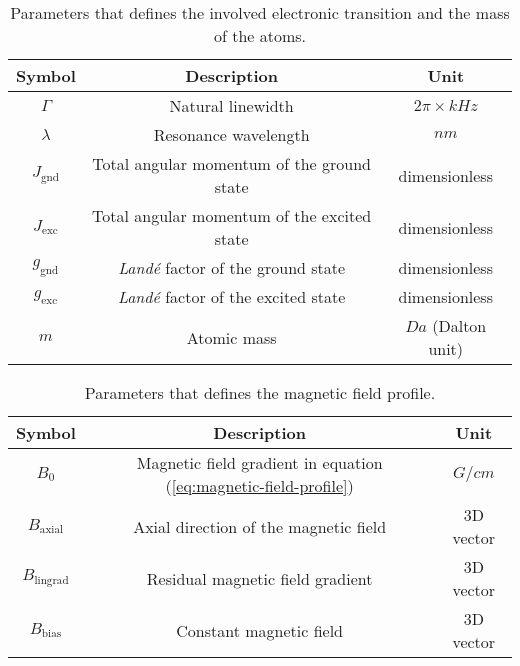 \begin{table}[ht!]
    \centering
    \begin{tabular}{|c|c|c|}
        \hline
        \textbf{Symbol} & \textbf{Description} & \textbf{Unit} \\ \hline
        $ \Gamma $ & Natural linewidth & $ 2\pi \times kHz $ \\
        $ \lambda $ & Resonance wavelength & $ nm $ \\
        $ J_{\textrm{gnd}} $ & Total angular momentum of the ground state & dimensionless \\
        $ J_{\textrm{exc}} $ & Total angular momentum of the excited state & dimensionless \\
        $ g_{\textrm{gnd}} $ & \textit{Landé} factor of the ground state & dimensionless \\
        $ g_{\textrm{exc}} $ & \textit{Landé} factor of the excited state & dimensionless \\
        $ m $ & Atomic mass & $ Da $ (Dalton unit) \\
        \hline
    \end{tabular}
    \caption{Parameters that defines the involved electronic transition and the mass of the atoms.}
    \label{tab:transition-parameters}
\end{table}

\begin{table}[ht!]
    \centering
    \begin{tabular}{|c|c|c|}
        \hline
        \textbf{Symbol} & \textbf{Description} & \textbf{Unit} \\ \hline
        $ B_0 $ & Magnetic field gradient in equation (\ref{eq:magnetic-field-profile}) & $ G/cm $ \\
        $ B_{\textrm{axial}} $ & Axial direction of the magnetic field & 3D vector \\
        $ B_{\textrm{lingrad}} $ & Residual magnetic field gradient & 3D vector \\
        $ B_{\textrm{bias}} $ & Constant magnetic field & 3D vector \\
        \hline
    \end{tabular}
    \caption{Parameters that defines the magnetic field profile.}
    \label{tab:magnetic-field-profile-parameters}
\end{table}

